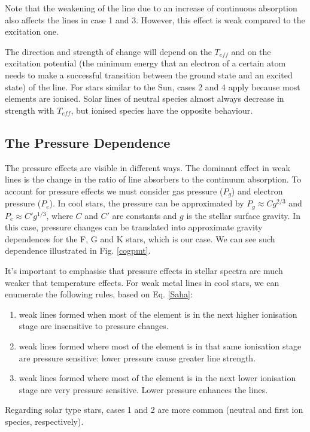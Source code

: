 \documentclass[dvips,12pt,a4paper]{report}
\begin{document}
{Note that the weakening of the line due to an increase of continuous absorption also affects the lines in case 1 and 3. However, this effect is weak compared to the excitation one.

The direction and strength of change will depend on the $T_{eff}$ and on the excitation potential (the minimum energy that an electron of a certain atom needs to make a successful transition between the ground state and an excited state) of the line. For stars similar to the Sun, cases 2 and 4 apply because most elements are ionised. Solar lines of neutral species almost always decrease in strength with $T_{eff}$, but ionised species have the opposite behaviour. 

\subsection{The Pressure Dependence}

The pressure effects are visible in different ways. The dominant effect in weak lines is the change in the ratio of line absorbers to the continuum absorption. To account for pressure effects we must consider gas pressure ($P_g$) and electron pressure ($P_e$). In cool stars, the pressure can be approximated by $P_g\approx C g^{2/3}$ and $P_e\approx C' g^{1/3}$, where $C$ and $C'$ are constants and $g$ is the stellar surface gravity. In this case, pressure changes can be translated into approximate gravity dependences for the F, G and K stars, which is our case. We can see such dependence illustrated in Fig. \ref{cogpmt}.

It's important to emphasise that pressure effects in stellar spectra are much weaker that temperature effects. For weak metal lines in cool stars, we can enumerate the following rules, based on Eq. \ref{Saha}:

\begin{enumerate}
 \item weak lines formed when most of the element is in the next higher ionisation stage are insensitive to pressure changes.
\item weak lines formed where most of the element is in that same ionisation stage are pressure sensitive: lower pressure cause greater line strength.
\item weak lines formed where most of the element is in the next lower ionisation stage are very pressure sensitive. Lower pressure enhances the lines.
\end{enumerate}

Regarding solar type stars, cases 1 and 2 are more common (neutral and first ion species, respectively).

}
\end{document}
